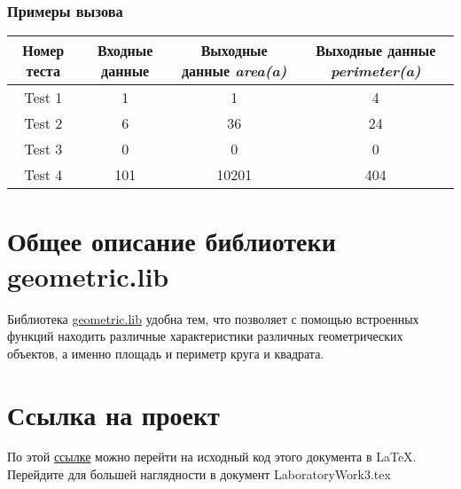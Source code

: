 \documentclass[14pt, a4paper]{article}
\begin{document}
\subsubsection*{\textbf{Примеры вызова}}

\begin{center}
    \begin{tabular}{| c | c | c | c |}
        \hline
        Номер теста & Входные данные & Выходные данные \textit{area(a)} & Выходные данные \textit{perimeter(a)}\\
        \hline
        Test 1 & 1 & 1 & 4 \\
        \hline
        Test 2 & 6 & 36 & 24 \\
        \hline
        Test 3 & 0 & 0 & 0 \\
        \hline
        Test 4 & 101 & 10201 & 404 \\
        \hline
    \end{tabular}
\end{center}

\section{Общее описание библиотеки geometric.lib}

Библиотека \href{https://github.com/Reetsuki/Laboratory-Work-3}{geometric.lib} удобна тем, что позволяет с помощью встроенных функций находить различные характеристики различных геометрических объектов, а именно площадь и периметр круга и квадрата.

\section{Ссылка на проект}

По этой \href{https://github.com/Reetsuki/Laboratory-Work-3/edit/main/LaboratoryWork3.tex}{ссылке} можно перейти на исходный код этого документа в LaTeX. Перейдите для большей наглядности в документ LaboratoryWork3.tex
\end{document}
